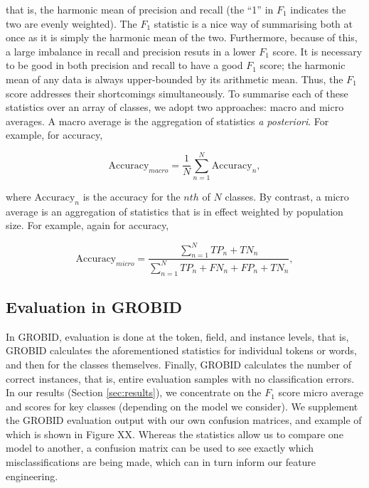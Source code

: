 that is, the harmonic mean of precision and recall (the ``1'' in $F_1$ indicates the two are evenly weighted). The $F_1$ statistic is a nice way of summarising both at once as it is simply the harmonic mean of the two. Furthermore, because of this, a large imbalance in recall and precision resuts in a lower $F_1$ score. It is necessary to be good in both precision and recall to have a good $F_1$ score; the harmonic mean of any data is always upper-bounded by its arithmetic mean. Thus, the $F_1$ score addresses their shortcomings simultaneously. To summarise each of these statistics over an array of classes, we adopt two approaches: macro and micro averages. A macro average is the aggregation of statistics \emph{a posteriori}. For example, for accuracy,

\begin{equation}
\text{Accuracy}_{macro} = \frac{1}{N}\sum_{n=1}^{N}\text{Accuracy}_n,
\label{eq:macroaccuracy}
\end{equation}

where $\text{Accuracy}_n$ is the accuracy for the $nth$ of $N$ classes. By contrast, a micro average is an aggregation of statistics that is in effect weighted by population size. For example, again for accuracy,

\begin{equation}
\text{Accuracy}_{micro} = \frac{\sum_{n=1}^N TP_n + TN_n}{\sum_{n=1}^N TP_n + FN_n + FP_n + TN_n},
\label{eq:microaccuracy}
\end{equation}

\subsection{Evaluation in GROBID}

In GROBID, evaluation is done at the token, field, and instance levels, that is, GROBID calculates the aforementioned statistics for individual tokens or words, and then for the classes themselves. Finally, GROBID calculates the number of correct instances, that is, entire evaluation samples with no classification errors. In our results (Section \ref{sec:results}), we concentrate on the $F_1$ score micro average and scores for key classes (depending on the model we consider). We supplement the GROBID evaluation output with our own confusion matrices, and example of which is shown in Figure XX. Whereas the statistics allow us to compare one model to another, a confusion matrix can be used to see exactly which misclassifications are being made, which can in turn inform our feature engineering.

